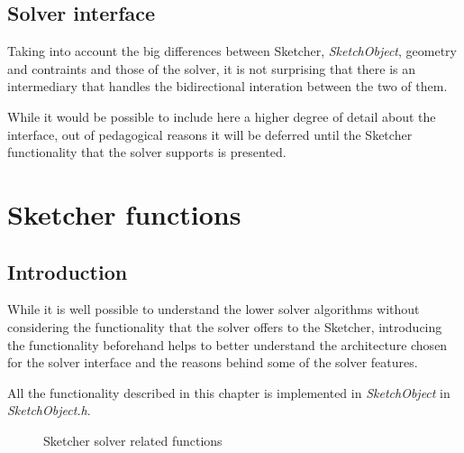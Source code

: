 \documentclass[12pt,twoside,a4paper]{book}
\newcommand{\SketchObject}{\emph{SketchObject}}
\begin{document}
    \section{Solver interface}

    Taking into account the big differences between Sketcher, \SketchObject{}, geometry and contraints and those of the solver, it is not surprising that there is an intermediary that handles the bidirectional interation between the two of them.

    While it would be possible to include here a higher degree of detail about the interface, out of pedagogical reasons it will be deferred until the Sketcher functionality that the solver supports is presented.


    \chapter{Sketcher functions}
    \label{chap:sketcherfunctions}
    \section{Introduction}

    While it is well possible to understand the lower solver algorithms without considering the functionality that the solver offers to the Sketcher, introducing the functionality beforehand helps to better understand the architecture chosen for the solver interface and the reasons behind some of the solver features.

    All the functionality described in this chapter is implemented in \SketchObject{} in \emph{SketchObject.h}.

    \begin{figure}
    \caption{Sketcher solver related functions}
    \end{figure}
\end{document}
